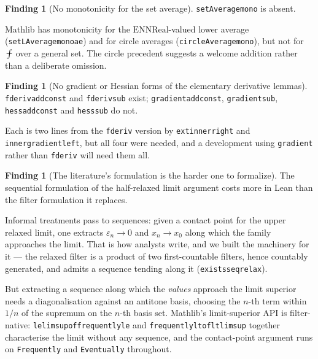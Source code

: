 \documentclass[11pt,reqno]{amsart}
\newcommand{\fint}{\mathop{\mathrlap{\,\rule[0.62ex]{0.62em}{0.5pt}}\int}}
\newcommand{\LEANREF}[1]{\texttt{\small\def\_{\textunderscore\allowbreak}#1}}
\newcommand{\eps}{\varepsilon}
\newcommand{\avgint}{\fint}
\theoremstyle{plain}
\theoremstyle{definition}
\newtheorem{finding}[theorem]{Finding}
\begin{document}
\begin{finding}[No monotonicity for the set average]\label{find:avg}
\LEANREF{setAverage\_mono} is absent.
\end{finding}

Mathlib has monotonicity for the $\mathrm{ENNReal}$-valued lower average
(\LEANREF{setLAverage\_mono\_ae}) and for circle averages
(\LEANREF{circleAverage\_mono}), but not for $\avgint$ over a general set. The
circle precedent suggests a welcome addition rather than a deliberate
omission.

\begin{finding}[No gradient or Hessian forms of the elementary derivative
lemmas]\label{find:gradlemmas}
\LEANREF{fderiv\_add\_const} and \LEANREF{fderiv\_sub} exist;
\LEANREF{gradient\_add\_const}, \LEANREF{gradient\_sub},
\LEANREF{hess\_add\_const} and \LEANREF{hess\_sub} do not.
\end{finding}

Each is two lines from the \LEANREF{fderiv} version by
\LEANREF{ext\_inner\_right} and \LEANREF{inner\_gradient\_left}, but all four
were needed, and a development using \LEANREF{gradient} rather than
\LEANREF{fderiv} will need them all.


\begin{finding}[The literature's formulation is the harder one to
formalize]\label{find:filter}
The sequential formulation of the half-relaxed limit argument costs more in
Lean than the filter formulation it replaces.
\end{finding}

Informal treatments pass to sequences: given a contact point for the upper
relaxed limit, one extracts $\eps_n \to 0$ and $x_n \to x_0$ along which the
family approaches the limit. That is how analysts write, and we built the
machinery for it --- the relaxed filter is a product of two first-countable
filters, hence countably generated, and admits a sequence tending along it
(\LEANREF{exists\_seq\_relax}).

But extracting a sequence along which the \emph{values} approach the limit
superior needs a diagonalisation against an antitone basis, choosing the
$n$-th term within $1/n$ of the supremum on the $n$-th basis set. Mathlib's
limit-superior API is filter-native: \LEANREF{le\_limsup\_of\_frequently\_le}
and \LEANREF{frequently\_lt\_of\_lt\_limsup} together characterise the limit
without any sequence, and the contact-point argument runs on
\LEANREF{Frequently} and \LEANREF{Eventually} throughout.
\end{document}
